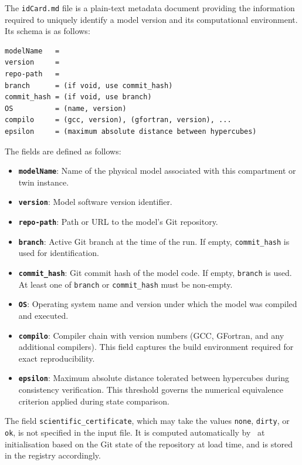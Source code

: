 The \texttt{idCard.md} file is a plain-text metadata document providing the information required to uniquely identify a model version and its computational environment. Its schema is as follows:

\begin{verbatim}
modelName   =
version     =
repo-path   =
branch      = (if void, use commit_hash)
commit_hash = (if void, use branch)
OS          = (name, version)
compilo     = (gcc, version), (gfortran, version), ...
epsilon     = (maximum absolute distance between hypercubes)
\end{verbatim}

The fields are defined as follows:

\begin{itemize}
    \item \textbf{\texttt{modelName}}: Name of the physical model associated with this compartment or twin instance.
    \item \textbf{\texttt{version}}: Model software version identifier.
    \item \textbf{\texttt{repo-path}}: Path or URL to the model's Git repository.
    \item \textbf{\texttt{branch}}: Active Git branch at the time of the run. If empty, \texttt{commit\_hash} is used for identification.
    \item \textbf{\texttt{commit\_hash}}: Git commit hash of the model code. If empty, \texttt{branch} is used. At least one of \texttt{branch} or \texttt{commit\_hash} must be non-empty.
    \item \textbf{\texttt{OS}}: Operating system name and version under which the model was compiled and executed.
    \item \textbf{\texttt{compilo}}: Compiler chain with version numbers (\eg GCC, GFortran, and any additional compilers). This field captures the build environment required for exact reproducibility.
    \item \textbf{\texttt{epsilon}}: Maximum absolute distance tolerated between hypercubes during consistency verification. This threshold governs the numerical equivalence criterion applied during state comparison.
\end{itemize}

The field \texttt{scientific\_certificate}, which may take the values \texttt{none}, \texttt{dirty}, or \texttt{ok}, is not specified in the input file. It is computed automatically by \hydrot\ at initialisation based on the Git state of the repository at load time, and is stored in the registry accordingly.